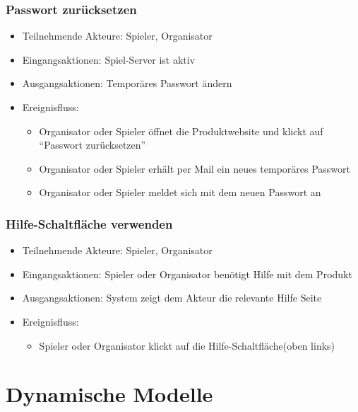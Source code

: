 \documentclass[a4paper]{scrreprt}
\begin{document}
    \subsection{Passwort zurücksetzen}
    \begin{itemize}
        \item Teilnehmende Akteure: \Gls{Spieler}, \Gls{Organisator}
        \item Eingangsaktionen: \Gls{Spiel-Server} ist aktiv
        \item Ausgangsaktionen: Temporäres Passwort ändern
        \item Ereignisfluss:
        \begin{itemize}
            \item \Gls{Organisator} oder \Gls{Spieler} öffnet die Produktwebsite und klickt auf \enquote{Passwort zurücksetzen}
            \item \Gls{Organisator} oder \Gls{Spieler} erhält per Mail ein neues temporäres Passwort
            \item \Gls{Organisator} oder \Gls{Spieler} meldet sich mit dem neuen Passwort an
        \end{itemize}
    \end{itemize}
       \subsection{Hilfe-Schaltfläche verwenden}
    \begin{itemize}
        \item Teilnehmende Akteure: \Gls{Spieler}, \Gls{Organisator}
        \item Eingangsaktionen: \Gls{Spieler} oder \Gls{Organisator} benötigt Hilfe mit dem Produkt
        \item Ausgangsaktionen: System zeigt dem Akteur die relevante Hilfe Seite
        \item Ereignisfluss:
            \begin{itemize}
                \item \Gls{Spieler} oder \Gls{Organisator} klickt auf die Hilfe-Schaltfläche(oben links)
            \end{itemize}
    \end{itemize}


    \chapter{Dynamische Modelle}
\end{document}

